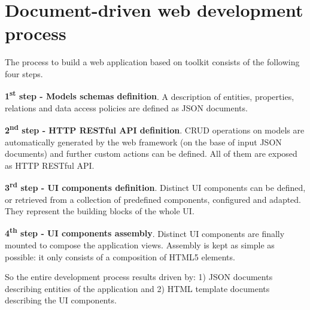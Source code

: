 \section{Document-driven web development process}\label{sec:dev-proc}

The process to build a web application based on  toolkit consists of the following four steps.

{\bf 1\textsuperscript{st} step - Models schemas definition}. A description of entities, properties, relations and data access policies are defined as JSON documents.

{\bf 2\textsuperscript{nd} step - HTTP RESTful API definition}. CRUD operations on models are automatically generated by the web framework (on the base of input JSON documents) and further custom actions can be defined. All of them are exposed as HTTP RESTful API.

{\bf 3\textsuperscript{rd} step - UI components definition}. Distinct UI components can be defined, or retrieved from a collection of predefined components, configured and adapted. They represent the building blocks of the whole UI.

{\bf 4\textsuperscript{th} step - UI components assembly}. Distinct UI components are finally mounted to compose the application views. Assembly is kept as simple as possible: it only consists of a composition of HTML5 elements.

\vspace{0.2cm}

So the entire development process results driven by: 1) JSON documents describing entities of the application and 2) HTML template documents describing the UI components.



